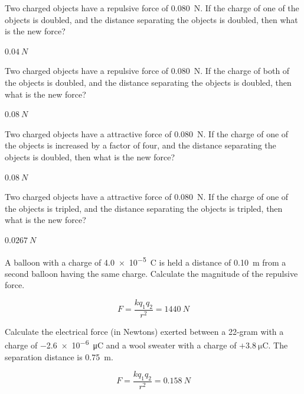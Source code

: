 \documentclass[]{exam}
\begin{document}
\begin{questions}
\question
Two charged objects have a repulsive force of \SI{0.080}{N}. If the charge of one of the objects is doubled, and the distance separating the objects is doubled, then what is the new force?

\begin{solution}
$\SI{0.04}{N}$
\end{solution}


\question
Two charged objects have a repulsive force of \SI{0.080}{N}. If the charge of both of the objects is doubled, and the distance separating the objects is doubled, then what is the new force?

\begin{solution}
$\SI{0.08}{N}$
\end{solution}

\question
Two charged objects have a attractive force of \SI{0.080}{N}. If the charge of one of the objects is increased by a factor of four, and the distance separating the objects is doubled, then what is the new force?

\begin{solution}
$\SI{0.08}{N}$
\end{solution}

\question
Two charged objects have a attractive force of \SI{0.080}{N}. If the charge of one of the objects is tripled, and the distance separating the objects is tripled, then what is the new force?

\begin{solution}
$\SI{0.0267}{N}$
\end{solution}








\question
A balloon with a charge of \SI{4.0e-5}{C} is held a distance of \SI{0.10}{m} from a second balloon having the same charge. Calculate the magnitude of the repulsive force.

\begin{solution}
\begin{equation*}
    F = \frac{kq_1q_2}{r^2} = \SI{1440}{N}
\end{equation*}
\end{solution}

\question
Calculate the electrical force (in Newtons) exerted between a 22-gram with a charge of \SI{-2.6e-6}{\micro\coulomb} and a wool sweater with a charge of $+\SI{3.8}{\micro\coulomb}$. The separation distance is \SI{0.75}{m}.

\begin{solution}
\begin{equation*}
    F = \frac{k q_1 q_2}{r^2} = \SI{0.158}{N}
\end{equation*}
\end{solution}


\end{questions}
\end{document}
